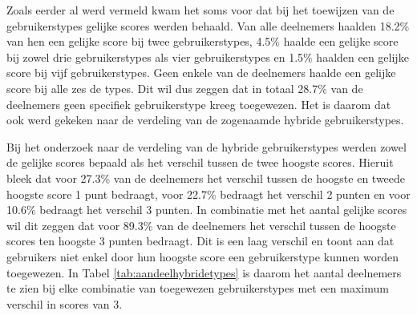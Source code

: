 Zoals eerder al werd vermeld kwam het soms voor dat bij het toewijzen van de gebruikerstypes gelijke scores werden behaald. Van alle deelnemers haalden 18.2\% van hen een gelijke score bij twee gebruikerstypes, 4.5\% haalde een gelijke score bij zowel drie gebruikerstypes als vier gebruikerstypes en 1.5\% haalden een gelijke score bij vijf gebruikerstypes. Geen enkele van de deelnemers haalde een gelijke score bij alle zes de types. Dit wil dus zeggen dat in totaal 28.7\% van de deelnemers geen specifiek gebruikerstype kreeg toegewezen. Het is daarom dat ook werd gekeken naar de verdeling van de zogenaamde hybride gebruikerstypes.

Bij het onderzoek naar de verdeling van de hybride gebruikerstypes werden zowel de gelijke scores bepaald als het verschil tussen de twee hoogste scores. Hieruit bleek dat voor 27.3\% van de deelnemers het verschil tussen de hoogste en tweede hoogste score 1 punt bedraagt, voor 22.7\% bedraagt het verschil 2 punten en voor 10.6\% bedraagt het verschil 3 punten. In combinatie met het aantal gelijke scores wil dit zeggen dat voor 89.3\% van de deelnemers het verschil tussen de hoogste scores ten hoogste 3 punten bedraagt. Dit is een laag verschil en toont aan dat gebruikers niet enkel door hun hoogste score een gebruikerstype kunnen worden toegewezen. In Tabel \ref{tab:aandeelhybridetypes} is daarom het aantal deelnemers te zien bij elke combinatie van toegewezen gebruikerstypes met een maximum verschil in scores van 3.

